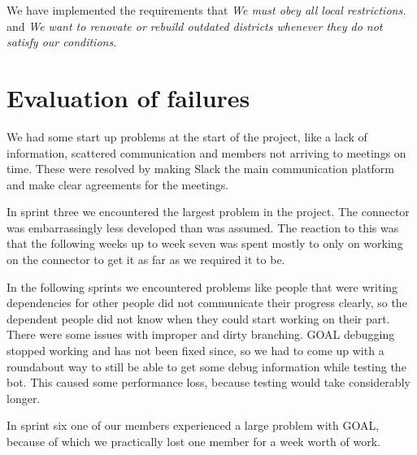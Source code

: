We have implemented the requirements that \emph{We must obey all local restrictions.} and \emph{We want to renovate or rebuild outdated districts whenever they do not satisfy our conditions}.

\section{Evaluation of failures}
We had some start up problems at the start of the project, like a lack of information, scattered communication and members not arriving to meetings on time. These were resolved by making Slack the main communication platform and make clear agreements for the meetings.

In sprint three we encountered the largest problem in the project. The connector was embarrassingly less developed than was assumed. The reaction to this was that the following weeks up to week seven was spent mostly to only on working on the connector to get it as far as we required it to be.

In the following sprints we encountered problems like people that were writing dependencies for other people did not communicate their progress clearly, so the dependent people did not know when they could start working on their part. There were some issues with improper and dirty branching. GOAL debugging stopped working and has not been fixed since, so we had to come up with a roundabout way to still be able to get some debug information while testing the bot. This caused some performance loss, because testing would take considerably longer.

In sprint six one of our members experienced a large problem with GOAL, because of which we practically lost one member for a week worth of work.